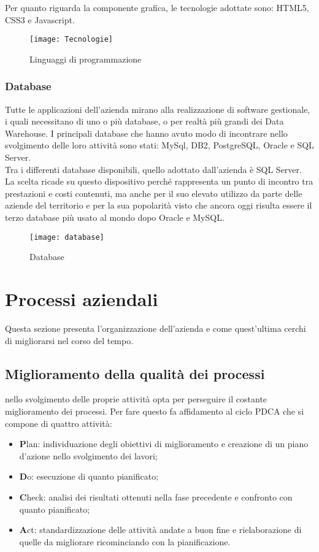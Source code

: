 Per quanto riguarda la componente grafica, le tecnologie adottate sono: HTML5, CSS3 e Javascript.

\begin{figure}[!h] 
	\centering 
	\texttt{[image: Tecnologie]} 
	\caption{Linguaggi di programmazione}
\end{figure}

\subsubsection*{Database}
Tutte le applicazioni dell'azienda mirano alla realizzazione di software gestionale, i quali necessitano di uno o più database, o per realtà più grandi dei Data Warehouse. I principali  database che hanno avuto modo di incontrare nello svolgimento delle loro attività sono stati: MySql, DB2, PostgreSQL, Oracle e SQL Server.\\

Tra i differenti database disponibili, quello adottato dall'azienda è SQL Server. La scelta ricade su questo dispositivo perché rappresenta un punto di incontro tra prestazioni e costi contenuti, ma anche per il suo elevato utilizzo da parte delle aziende del territorio e per la sua popolarità visto che ancora oggi risulta essere il terzo database più usato al mondo dopo Oracle e MySQL. 

\begin{figure}[!h] 
	\centering 
	\texttt{[image: database]} 
	\caption{Database}
\end{figure}


\section{Processi aziendali}
\label{cap1:Processi aziendali}

Questa sezione presenta l'organizzazione dell'azienda e come quest'ultima cerchi di migliorarsi nel corso del tempo. 

\subsection{Miglioramento della qualità dei processi}
\label{cap1:Miglioramento della qualità dei processi}

\azienda nello svolgimento delle proprie attività opta per perseguire il costante miglioramento dei processi. Per fare questo fa affidamento al ciclo PDCA che si compone di quattro attività:
\begin{itemize}
	\item \textbf{P}lan: individuazione degli obiettivi di miglioramento e creazione di un piano d'azione nello svolgimento dei lavori;
	\item \textbf{D}o: esecuzione di quanto pianificato;
	\item \textbf{C}heck: analisi dei risultati ottenuti nella fase precedente e confronto con quanto pianificato; 
	\item \textbf{A}ct: standardizzazione delle attività andate a buon fine e rielaborazione di quelle da migliorare ricominciando con la pianificazione.
\end{itemize}

